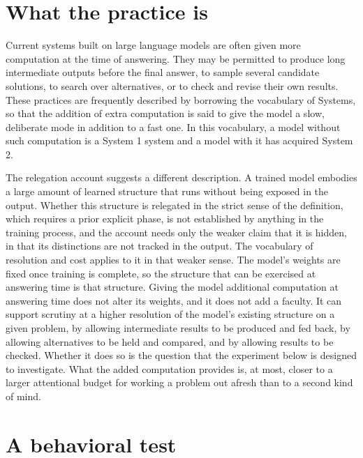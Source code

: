 \documentclass[11pt]{report}
\theoremstyle{remark}
\theoremstyle{definition}
\begin{document}
\section{What the practice is}

Current systems built on large language models are often given more computation at the time of answering. They may be permitted to produce long intermediate outputs before the final answer, to sample several candidate solutions, to search over alternatives, or to check and revise their own results. These practices are frequently described by borrowing the vocabulary of Systems, so that the addition of extra computation is said to give the model a slow, deliberate mode in addition to a fast one. In this vocabulary, a model without such computation is a System 1 system and a model with it has acquired System 2.

The relegation account suggests a different description. A trained model embodies a large amount of learned structure that runs without being exposed in the output. Whether this structure is relegated in the strict sense of the definition, which requires a prior explicit phase, is not established by anything in the training process, and the account needs only the weaker claim that it is hidden, in that its distinctions are not tracked in the output. The vocabulary of resolution and cost applies to it in that weaker sense. The model's weights are fixed once training is complete, so the structure that can be exercised at answering time is that structure. Giving the model additional computation at answering time does not alter its weights, and it does not add a faculty. It can support scrutiny at a higher resolution of the model's existing structure on a given problem, by allowing intermediate results to be produced and fed back, by allowing alternatives to be held and compared, and by allowing results to be checked. Whether it does so is the question that the experiment below is designed to investigate. What the added computation provides is, at most, closer to a larger attentional budget for working a problem out afresh than to a second kind of mind.

\section{A behavioral test}
\end{document}
